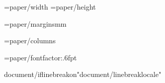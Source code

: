 




\PaperWidth={paper/width}
\PaperHeight={paper/height}

\MarginUnit={paper/margins}mm
\def\TopMarginFactor{{{paper/topmarginfactor}}}
\def\BottomMarginFactor{{{paper/bottommarginfactor}}}

\BodyColumns={paper/columns}
\def\ColumnGutterFactor{{{document/colgutterfactor}}}

\def\LineSpacingFactor{{{paragraph/linespacing}}}
\def\VerticalSpaceFactor{{1.0}}

\FontSizeUnit={paper/fontfactor:.6f}pt   %


\def\regular{{"{fontregular/name}"}}
\def\bold{{"{fontbold/name}:{fontbold/embolden}{fontbold/slant}"}}
\def\italic{{"{fontitalic/name}:{fontitalic/embolden}{fontitalic/slant}"}}
\def\bolditalic{{"{fontbolditalic/name}:{fontbolditalic/embolden}{fontbolditalic/slant}"}}

{document/iflinebreakon}\XeTeXlinebreaklocale "{document/linebreaklocale}"


